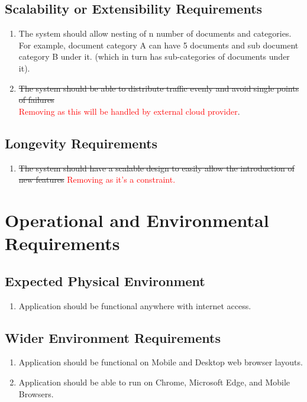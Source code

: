 \documentclass[12pt]{article}
\begin{document}
\subsection{Scalability or Extensibility Requirements}
\begin{enumerate}[{PR-SE}1.]
  \item The system should allow nesting of n number of documents and
    categories. For example, document category A can have 5 documents
    and sub document category B under it. (which in turn has
    sub-categories of documents under it).
  \item \sout{The system should be able to distribute traffic evenly and
    avoid single points of failures}\\
    \textcolor{red}{Removing as this will be handled by external
    cloud provider}.
\end{enumerate}

\subsection{Longevity Requirements}
\begin{enumerate}[{PR-LR}1.]
  \item \sout{The system should have a scalable design to easily allow the
    introduction of new features} \textcolor{red}{Removing as it's a
    constraint.}
\end{enumerate}

\newpage{}
\section{Operational and Environmental Requirements}
\subsection{Expected Physical Environment}
\begin{enumerate} [{OE-PE}1.]
  \item Application should be functional anywhere with internet access.
\end{enumerate}
\subsection{Wider Environment Requirements}
\begin{enumerate} [{OE-WE}1.]
  \item Application should be functional on Mobile and Desktop web
    browser layouts.
  \item Application should be able to run on Chrome, Microsoft Edge,
    and Mobile Browsers.
\end{enumerate}
\end{document}
